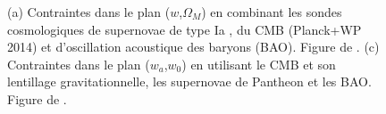 \documentclass[../main/main.tex]{subfiles}
\begin{document}
\begin{figure}[ht]
\centering
{}\hfill
{}
\caption[]{(a) Contraintes dans le plan
  ($w$,$\Omega_{M}$) en combinant les sondes
  cosmologiques de supernovae de type Ia \citep[JLA,][]{Betoule2014}, du CMB (Planck+WP 2014) et d'oscillation
  acoustique des baryons (BAO). Figure de \citet{Betoule2014}. (c)
  Contraintes dans le plan ($w_{a}$,$w_{0}$) en utilisant le
  CMB et son lentillage gravitationnelle, les supernovae de Pantheon
  \citep{Scolnicpantheon18} et les BAO. Figure de \citet{Planckparams2018}.}
\label{fig:darkenergy}
\end{figure}

%
%
\end{document}
